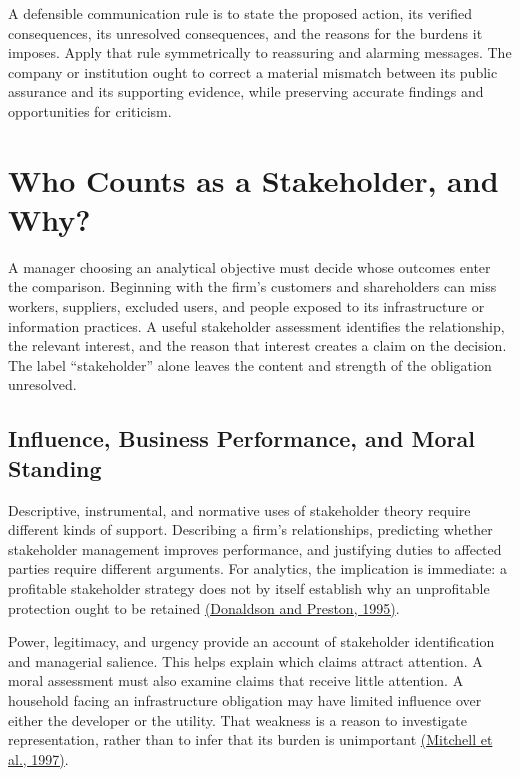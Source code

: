 A defensible communication rule is to state the proposed action, its
verified consequences, its unresolved consequences, and the reasons for
the burdens it imposes. Apply that rule symmetrically to reassuring and
alarming messages. The company or institution ought to correct a
material mismatch between its public assurance and its supporting
evidence, while preserving accurate findings and opportunities for
criticism.


\hypertarget{M09-who-counts-as-a-stakeholder-and-why}{%
\section{Who Counts as a Stakeholder, and
Why?}\label{M09-who-counts-as-a-stakeholder-and-why}}

\noindent \noindent A manager choosing an analytical objective must decide whose
outcomes enter the comparison. Beginning with the firm's customers and
shareholders can miss workers, suppliers, excluded users, and people
exposed to its infrastructure or information practices. A useful
stakeholder assessment identifies the relationship, the relevant
interest, and the reason that interest creates a claim on the decision.
The label ``stakeholder'' alone leaves the content and strength of the
obligation unresolved.

\hypertarget{M09-influence-business-performance-and-moral-standing}{%
\subsection{Influence, Business Performance, and Moral
Standing}\label{M09-influence-business-performance-and-moral-standing}}

\noindent \noindent Descriptive, instrumental, and normative uses of stakeholder
theory require different kinds of support. Describing a firm's
relationships, predicting whether stakeholder management improves
performance, and justifying duties to affected parties require different
arguments. For analytics, the implication is immediate: a profitable
stakeholder strategy does not by itself establish why an unprofitable
protection ought to be retained
\href{https://journals.aom.org/doi/full/10.5465/amr.1995.9503271992}{(Donaldson
and Preston, 1995)}.

Power, legitimacy, and urgency provide an account of stakeholder
identification and managerial salience. This helps explain which claims
attract attention. A moral assessment must also examine claims that
receive little attention. A household facing an infrastructure
obligation may have limited influence over either the developer or the
utility. That weakness is a reason to investigate representation, rather
than to infer that its burden is unimportant
\href{https://doi.org/10.5465/amr.1997.9711022105}{(Mitchell et al.,
1997)}.

